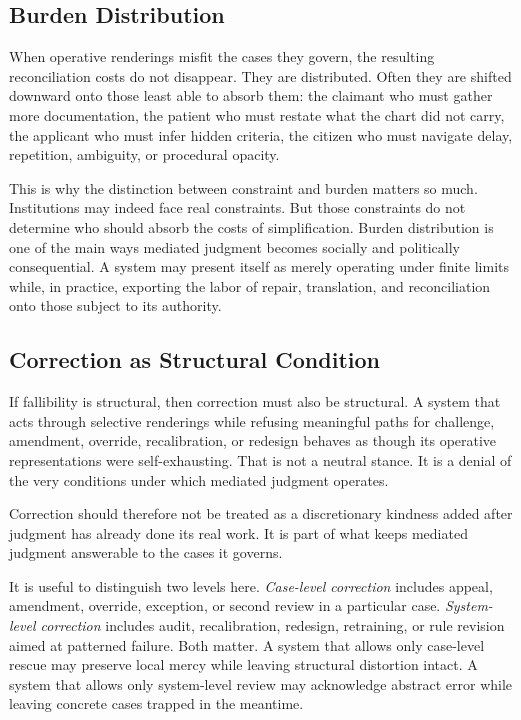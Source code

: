 \documentclass[11pt]{article}
\renewcommand{\emph}[1]{\textit{#1}}
\begin{document}
\subsection{Burden Distribution}

When operative renderings misfit the cases they govern, the resulting reconciliation costs do not disappear. They are distributed. Often they are shifted downward onto those least able to absorb them: the claimant who must gather more documentation, the patient who must restate what the chart did not carry, the applicant who must infer hidden criteria, the citizen who must navigate delay, repetition, ambiguity, or procedural opacity.

This is why the distinction between constraint and burden matters so much. Institutions may indeed face real constraints. But those constraints do not determine who should absorb the costs of simplification. Burden distribution is one of the main ways mediated judgment becomes socially and politically consequential. A system may present itself as merely operating under finite limits while, in practice, exporting the labor of repair, translation, and reconciliation onto those subject to its authority.

\subsection{Correction as Structural Condition}

If fallibility is structural, then correction must also be structural. A system that acts through selective renderings while refusing meaningful paths for challenge, amendment, override, recalibration, or redesign behaves as though its operative representations were self-exhausting. That is not a neutral stance. It is a denial of the very conditions under which mediated judgment operates.

Correction should therefore not be treated as a discretionary kindness added after judgment has already done its real work. It is part of what keeps mediated judgment answerable to the cases it governs.

It is useful to distinguish two levels here. \emph{Case-level correction} includes appeal, amendment, override, exception, or second review in a particular case. \emph{System-level correction} includes audit, recalibration, redesign, retraining, or rule revision aimed at patterned failure. Both matter. A system that allows only case-level rescue may preserve local mercy while leaving structural distortion intact. A system that allows only system-level review may acknowledge abstract error while leaving concrete cases trapped in the meantime.
\end{document}

